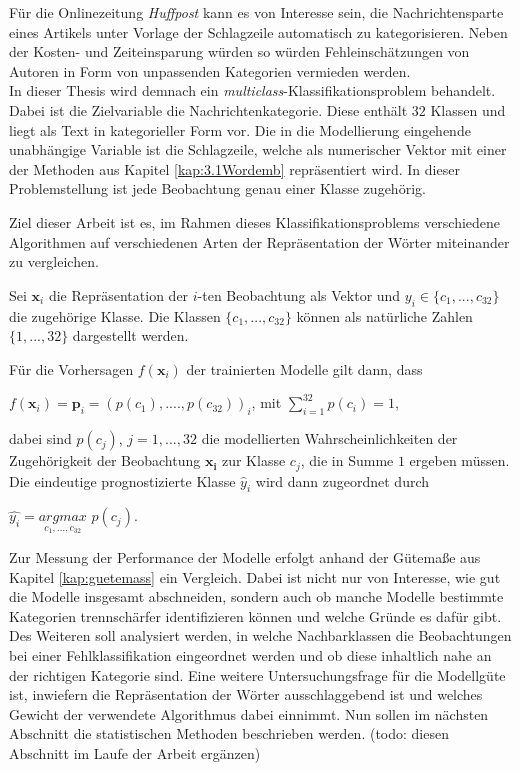\documentclass[a4paper,11pt]{article}
\begin{document}
Für die Onlinezeitung \textit{Huffpost} kann es von Interesse sein, die Nachrichtensparte eines Artikels unter Vorlage der Schlagzeile automatisch zu kategorisieren. Neben der Kosten- und Zeiteinsparung würden so würden Fehleinschätzungen von Autoren in Form von unpassenden Kategorien vermieden werden.\\
In dieser Thesis wird demnach ein \textit{multiclass}-Klassifikations\-problem behandelt. Dabei ist die Zielvariable die Nachrichtenkategorie. Diese enthält $32$ Klassen und liegt als Text in kategorieller Form vor. Die in die Modellierung eingehende unabhängige Variable ist die Schlagzeile, welche als numerischer Vektor mit einer der Methoden aus Kapitel \ref{kap:3.1Wordemb} repräsentiert wird. In dieser Problemstellung ist jede Beobachtung genau einer Klasse zugehörig. 

Ziel dieser Arbeit ist es, im Rahmen dieses Klassifikationsproblems verschiedene Algorithmen auf verschiedenen Arten der Repräsentation der Wörter miteinander zu vergleichen. 

Sei $\bm{x}_i$ die Repräsentation der $i$-ten Beobachtung als Vektor und $y_i \in \{c_1, ..., c_{32} \}$ die zugehörige Klasse. Die Klassen $\{c_1, ..., c_{32} \}$ können als natürliche Zahlen $\{1, ..., 32 \}$ dargestellt werden.


Für die Vorhersagen $f(\bm{x}_i)$ der trainierten Modelle gilt dann, dass
\begin{center}
$f(\bm{x}_i) = \bm{p}_i = (p(c_1), ...., p(c_{32}))_i$, \hspace{2cm} mit $\sum\limits_{i = 1}^{32} p(c_i) = 1 $,
\end{center}
dabei sind $p(c_j)$, $j = 1,...,32$ die modellierten Wahrscheinlichkeiten der Zugehörigkeit der Beobachtung $\bm{x_i}$ zur Klasse $c_j$, die in Summe $1$ ergeben müssen. Die eindeutige prognostizierte Klasse $\hat{y}_i$ wird dann zugeordnet durch 
\begin{center}
    $\hat{y_i} =  \underset{c_1,...,c_{32}}{argmax}$ $p(c_j)$.
\end{center}

Zur Messung der Performance der Modelle erfolgt anhand der Gütemaße aus Kapitel \ref{kap:guetemass} ein Vergleich. Dabei ist nicht nur von Interesse, wie gut die Modelle insgesamt abschneiden, sondern auch ob manche Modelle bestimmte Kategorien trennschärfer identifizieren können und welche Gründe es dafür gibt. Des Weiteren soll analysiert werden, in welche Nachbarklassen die Beobachtungen bei einer Fehlklassifikation eingeordnet werden und ob diese inhaltlich nahe an der richtigen Kategorie sind. Eine weitere Untersuchungsfrage für die Modellgüte ist, inwiefern die Repräsentation der Wörter ausschlaggebend ist und welches Gewicht der verwendete Algorithmus dabei einnimmt.
Nun sollen im nächsten Abschnitt die statistischen Methoden beschrieben werden.
(todo: diesen Abschnitt im Laufe der Arbeit ergänzen)
\end{document}
